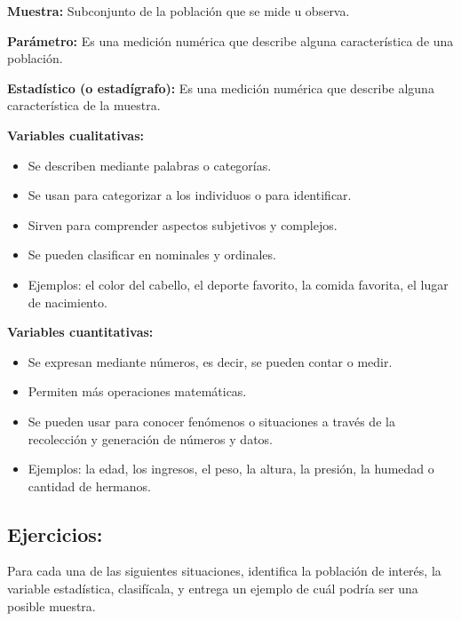\documentclass[12pt, letterpaper]{article}
\begin{document}
\textbf{Muestra:} %
Subconjunto de la población que se mide u observa.

\textbf{Parámetro:} %
Es una medición numérica que describe alguna característica de una población.

\textbf{Estadístico (o estadígrafo):} %
Es una medición numérica que describe alguna característica de la muestra.

\textbf{Variables cualitativas:} %
\begin{itemize}
    \item Se describen mediante palabras o categorías.
    \item Se usan para categorizar a los individuos o para identificar.
    \item Sirven para comprender aspectos subjetivos y complejos.
    \item Se pueden clasificar en nominales y ordinales.
    \item Ejemplos: el color del cabello, el deporte favorito, la comida favorita, el lugar de nacimiento.
\end{itemize}

\textbf{Variables cuantitativas:} %
\begin{itemize}
    \item Se expresan mediante números, es decir, se pueden contar o medir.
    \item Permiten más operaciones matemáticas.
    \item Se pueden usar para conocer fenómenos o situaciones a través de la recolección y generación de números y datos.
    \item Ejemplos: la edad, los ingresos, el peso, la altura, la presión, la humedad o cantidad de hermanos.
\end{itemize}

\subsection{Ejercicios:}
Para cada una de las siguientes situaciones, identifica la población de interés, la variable estadística, clasifícala, y entrega un ejemplo de cuál podría ser una posible muestra.
\end{document}
